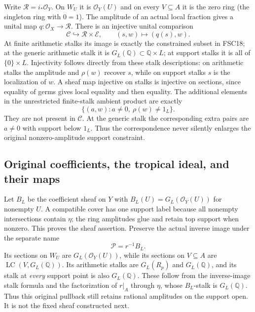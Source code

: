 Write $\mathcal R=i_*\mathcal O_Y$. On $W_U$ it is
$\mathcal O_Y(U)$ and on every $V\subseteq A$ it is the zero ring
(the singleton ring with $0=1$). The amplitude of an actual local
fraction gives a unital map $q:\mathcal O_X\to\mathcal R$.
There is an injective unital comparison
\begin{equation}\tag{FSC19}
 \mathcal C\hookrightarrow\mathcal R\times\mathcal E,
              \qquad (s,w)\longmapsto(q(s),w).
\end{equation}
At finite arithmetic stalks its image is exactly the constrained
subset in FSC18; at the generic arithmetic stalk it is
$G_L(\mathbb Q)\subset\mathbb Q\times L$; at support stalks it is
all of $\{0\}\times L$. Injectivity follows directly from these
stalk descriptions: on arithmetic stalks the amplitude and
$\rho(w)$ recover $s$, while on support stalks $s$ is the localization
of $w$. A sheaf map injective on stalks is injective on sections,
since equality of germs gives local equality and then equality.
The additional elements in the unrestricted finite-stalk ambient
product are exactly
\begin{equation}\tag{FSC20}
 \{(a,w):a\ne0,\ \rho(w)\ne1_L\}.
\end{equation}
They are not present in $\mathcal C$. At the generic stalk the
corresponding extra pairs are $a\ne0$ with support below $1_L$.
Thus the correspondence never silently enlarges the original
nonzero-amplitude support constraint.

\subsection{Original coefficients, the tropical ideal, and their maps}
Let $B_L$ be the coefficient sheaf on $Y$ with
$B_L(U)=G_L(\mathcal O_Y(U))$ for nonempty $U$. A compatible cover has
one support label because all nonempty intersections contain $\eta$;
the ring amplitudes glue and retain top support when nonzero. This
proves the sheaf assertion. Preserve the actual inverse image under
the separate name
\[
 \mathcal P=r^{-1}B_L.
\]
Its sections on $W_U$ are $G_L(\mathcal O_Y(U))$, while its sections
on $V\subseteq A$ are $\operatorname{LC}(V,G_L(\mathbb Q))$.
Its arithmetic stalks are $G_L(R_p)$ and $G_L(\mathbb Q)$, and its
stalk at \emph{every} support point is also $G_L(\mathbb Q)$.
These follow from the inverse-image stalk formula and the factorization
of $r|_A$ through $\eta$, whose $B_L$-stalk is $G_L(\mathbb Q)$.
Thus this original pullback still retains rational amplitudes on the
support open. It is not the fixed sheaf constructed next.

